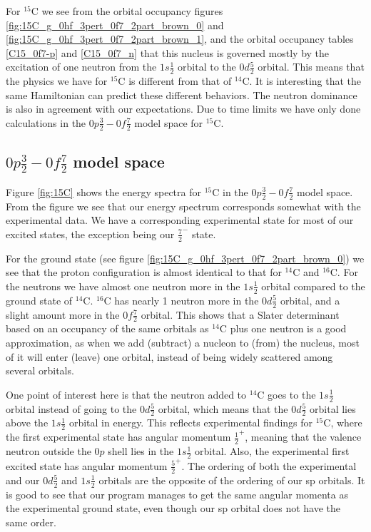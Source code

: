 For $^{15}$C we see from the orbital occupancy figures
\ref{fig:15C_g_0hf_3pert_0f7_2part_brown_0} and
\ref{fig:15C_g_0hf_3pert_0f7_2part_brown_1}, and the orbital occupancy tables
\ref{C15_0f7-p} and \ref{C15_0f7_n} that this nucleus is governed mostly by the
excitation of one neutron from the $1s\frac12$ orbital to the $0d\frac52$
orbital. This means that the physics we have for $^{15}$C is different from
that of $^{14}$C. It is interesting that the same Hamiltonian can predict
these different behaviors. The neutron dominance is also in agreement with our
expectations. Due to time limits we have only done calculations in the
$0p\frac32-0f\frac72$ model space for $^{15}$C.


\subsection{$0p\frac32-0f\frac72$ model space}

Figure \ref{fig:15C} shows the energy spectra for $^{15}$C in the
$0p\frac32-0f\frac72$ model space. From the figure we see that our energy
spectrum corresponds somewhat with the experimental data. We have a
corresponding experimental state for most of our excited states, the exception
being our $\frac72^-$ state.

For the ground state (see figure \ref{fig:15C_g_0hf_3pert_0f7_2part_brown_0})
we see that the proton configuration is almost identical to that for $^{14}$C
and $^{16}$C. For the neutrons we have almost one neutron more in the
$1s\frac12$ orbital compared to the ground state of $^{14}$C. $^{16}$C has
nearly 1 neutron more in the $0d\frac52$ orbital, and a slight amount more in the
$0f\frac72$ orbital. This shows that a Slater determinant based on an occupancy of the same  
orbitals as $^{14}$C plus one neutron is a good approximation,
as when we add (subtract) a nucleon to (from) the nucleus, most of it will enter
(leave) one orbital, instead of being widely scattered among several orbitals.

One point of interest here is that the neutron added to $^{14}$C goes to the
$1s\frac12$ orbital instead of going to the $0d\frac52$ orbital, which means
that the $0d\frac52$ orbital lies above the $1s\frac12$ orbital in energy. This
reflects experimental findings for $^{15}$C, where the first experimental state
has angular momentum $\frac12^+$, meaning that the valence neutron outside the
$0p$ shell lies in the $1s\frac12$ orbital. Also, the experimental first
excited state has angular momentum $\frac52^+$. The ordering of both the
experimental and our $0d\frac52$ and $1s\frac12$ orbitals are the opposite of
the ordering of our sp orbitals. It is good to see that our program manages to
get the same angular momenta as the experimental ground state, even though our
sp orbital does not have the same order.

